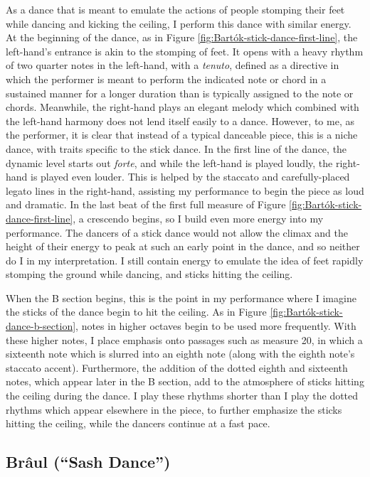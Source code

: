 As a dance that is meant to emulate the actions of people stomping their feet while dancing and kicking the ceiling, I perform this dance with similar energy. At the beginning of the dance, as in Figure \ref{fig:Bartók-stick-dance-first-line}\autocite{Lung_2016}, the left-hand's entrance is akin to the stomping of feet. It opens with a heavy rhythm of two quarter notes in the left-hand, with a \textit{tenuto}, defined as a directive in which the performer is meant to perform the indicated note or chord in a sustained manner for a longer duration than is typically assigned to the note or chords. Meanwhile, the right-hand plays an elegant melody which combined with the left-hand harmony does not lend itself easily to a dance. However, to me, as the performer, it is clear that instead of a typical danceable piece, this is a niche dance, with traits specific to the stick dance. In the first line of the dance, the dynamic level starts out \textit{forte}, and while the left-hand is played loudly, the right-hand is played even louder. This is helped by the staccato and carefully-placed legato lines in the right-hand, assisting my performance to begin the piece as loud and dramatic. In the last beat of the first full measure of Figure \ref{fig:Bartók-stick-dance-first-line}\autocite{Lung_2016}, a crescendo begins, so I build even more energy into my performance. The dancers of a stick dance would not allow the climax and the height of their energy to peak at such an early point in the dance, and so neither do I in my interpretation. I still contain energy to emulate the idea of feet rapidly stomping the ground while dancing, and sticks hitting the ceiling. 

When the B section begins, this is the point in my performance where I imagine the sticks of the dance begin to hit the ceiling. As in Figure \ref{fig:Bartók-stick-dance-b-section}\autocite{Lung_2016}, notes in higher octaves begin to be used more frequently. With these higher notes, I place emphasis onto passages such as measure 20, in which a sixteenth note which is slurred into an eighth note (along with the eighth note's staccato accent). Furthermore, the addition of the dotted eighth and sixteenth notes, which appear later in the B section, add to the atmosphere of sticks hitting the ceiling during the dance. I play these rhythms shorter than I play the dotted rhythms which appear elsewhere in the piece, to further emphasize the sticks hitting the ceiling, while the dancers continue at a fast pace. 

\subsection{Brâul (``Sash Dance'')}

